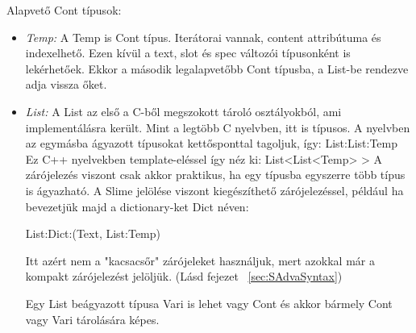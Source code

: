 Alapvető Cont típusok:
\begin{itemize}
\item \emph{Temp:} 
A Temp is Cont típus. 
Iterátorai vannak, content attribútuma és indexelhető.
Ezen kívül a text, slot és spec változói típusonként is lekérhetőek.
Ekkor a második legalapvetőbb Cont típusba, a List-be rendezve adja vissza őket.
\item \emph{List:} 
A List az első a C-ből megszokott tároló osztályokból, ami implementálásra került.
Mint a legtöbb C nyelvben, itt is típusos.
A nyelvben az egymásba ágyazott típusokat kettősponttal tagoljuk, így: List:List:Temp
Ez C++ nyelvekben template-eléssel így néz ki: List<List<Temp> >
A zárójelezés viszont csak akkor praktikus, ha egy típusba egyszerre több típus is ágyazható. 
A Slime jelölése viszont kiegészíthető zárójelezéssel, például ha bevezetjük majd a dictionary-ket Dict néven:

List:Dict:(Text, List:Temp)

Itt azért nem a "kacsacsőr" zárójeleket használjuk, mert azokkal már a kompakt zárójelezést jelöljük. (Lásd fejezet ~\ref{sec:SAdvaSyntax})

Egy List beágyazott típusa Vari is lehet vagy Cont és akkor bármely Cont vagy Vari tárolására képes.


\end{itemize}
